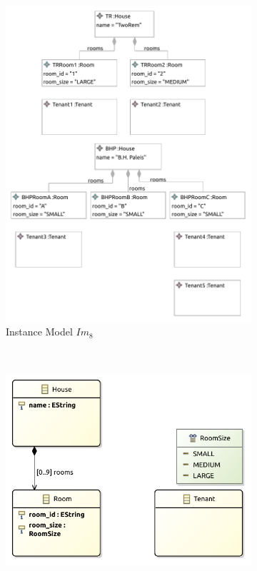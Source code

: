 \begin{figure}[p]
    \centering
    \begin{subfigure}{0.98\textwidth}
        \centering
        \includegraphics{images/06_application/instance_model/step08.pdf}
        \caption{Instance Model $Im_8$}
        \label{fig:application:building_the_model:tenants:ecore:instance_model}
    \end{subfigure}
    \\
    \begin{subfigure}{0.98\textwidth}
        \centering
        \includegraphics{images/06_application/type_model/step08.pdf}

\end{subfigure}
\end{figure}
